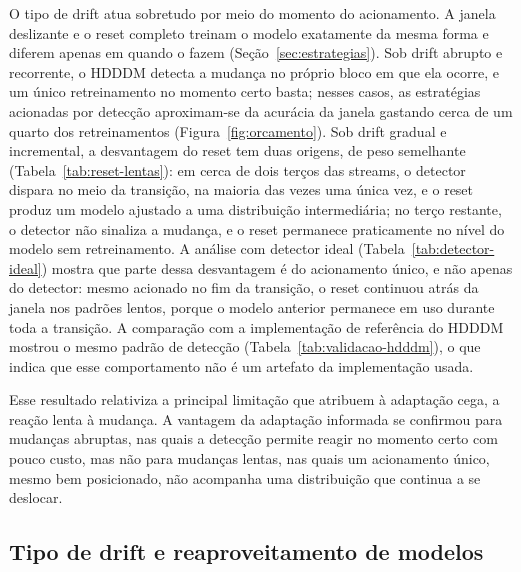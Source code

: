O tipo de drift atua sobretudo por meio do momento do acionamento. A janela
deslizante e o reset completo treinam o modelo exatamente da mesma forma e
diferem apenas em quando o fazem (Seção~\ref{sec:estrategias}). Sob drift
abrupto e recorrente, o HDDDM detecta a mudança no próprio bloco em que ela
ocorre, e um único retreinamento no momento certo basta; nesses casos, as
estratégias acionadas por detecção aproximam-se da acurácia da janela
gastando cerca de um quarto dos retreinamentos (Figura~\ref{fig:orcamento}). Sob drift
gradual e incremental, a desvantagem do reset tem duas origens, de peso
semelhante (Tabela~\ref{tab:reset-lentas}): em cerca de dois terços das
streams, o detector dispara no meio da transição, na maioria das vezes uma
única vez, e o reset produz um modelo ajustado a uma distribuição
intermediária; no terço restante, o detector não sinaliza a mudança, e o
reset permanece praticamente no nível do modelo sem retreinamento. A
análise com detector ideal (Tabela~\ref{tab:detector-ideal}) mostra que
parte dessa desvantagem é do acionamento único, e não apenas do detector:
mesmo acionado no fim da transição, o reset continuou atrás da janela nos
padrões lentos, porque o modelo anterior permanece em uso durante toda a
transição. A comparação com
a implementação de referência do HDDDM mostrou o mesmo padrão de detecção
(Tabela~\ref{tab:validacao-hdddm}), o que indica que esse comportamento não é
um artefato da implementação usada.

Esse resultado relativiza a principal limitação que 
atribuem à adaptação cega, a reação lenta à mudança. A vantagem da adaptação
informada se confirmou para mudanças abruptas, nas quais a detecção permite
reagir no momento certo com pouco custo, mas não para mudanças lentas, nas
quais um acionamento único, mesmo bem posicionado, não acompanha uma
distribuição que continua a se deslocar.

\subsection{Tipo de drift e reaproveitamento de modelos}

